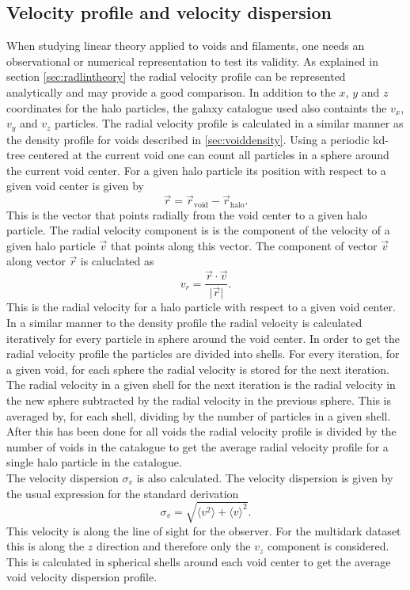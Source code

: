 \subsection{Velocity profile and velocity dispersion}\label{sec:voidvel}
When studying linear theory applied to voids and filaments, one needs an observational or
numerical representation to test its validity. As explained in section
\ref{sec:radlintheory} the radial velocity profile can be represented analytically and
may provide a good comparison. In addition to the $x$, $y$ and $z$ coordinates for the
halo particles, the galaxy catalogue used also containts the $v_x$, $v_y$ and
$v_z$ particles. The radial velocity profile is calculated in a
similar manner as the density profile for voids described in
\ref{sec:voiddensity}. Using a periodic kd-tree centered at the current void one
can count all particles in a sphere around the current void center. For a given
halo particle its position with respect to a given void center is given by
\begin{equation}\label{eq:voidpos}
    \vec{r}=\vec{r}_{\mathrm{void}}-\vec{r}_{\mathrm{halo}}.
\end{equation}
This is the vector that points radially from the void center to a given halo
particle. The radial velocity component is is the component of the velocity of a
given halo particle $\vec{v}$ that points along this vector. The component of vector
$\vec{v}$ along vector $\vec{r}$ is caluclated as
\begin{equation}
    v_r=\frac{\vec{r}\cdot\vec{v}}{\vert\vec{r}\vert}.
\end{equation}
This is the radial velocity for a halo particle with respect to a given void
center. In a similar manner to the density profile the radial velocity is
calculated iteratively for every particle in sphere around the void center. In
order to get the radial velocity profile the particles are divided into
shells. For every iteration, for a given void, for each sphere the radial
velocity is stored for the next iteration. The radial velocity in a given shell
for the next iteration is the radial velocity in the new sphere subtracted by
the radial velocity in the previous sphere. This is averaged by, for each shell,
dividing by the number of particles in a given shell. After this has
been done for all voids the radial velocity profile is divided by the number of voids in the catalogue to get
the average radial velocity profile for a single halo particle in the catalogue.
\\\indent
The velocity dispersion $\sigma_v$ is also calculated. The velocity dispersion
is given by the usual expression for the standard derivation
\begin{equation}\label{eq:sigma_v}
    \sigma_{v} = \sqrt{\langle v^2 \rangle + \langle v\rangle^2}.
\end{equation}
This velocity is along the line of sight for the observer. For the multidark
dataset this is along the $z$ direction and therefore only the $v_z$ component
is considered. This is calculated in spherical shells around each void center to
get the average void velocity dispersion profile.
